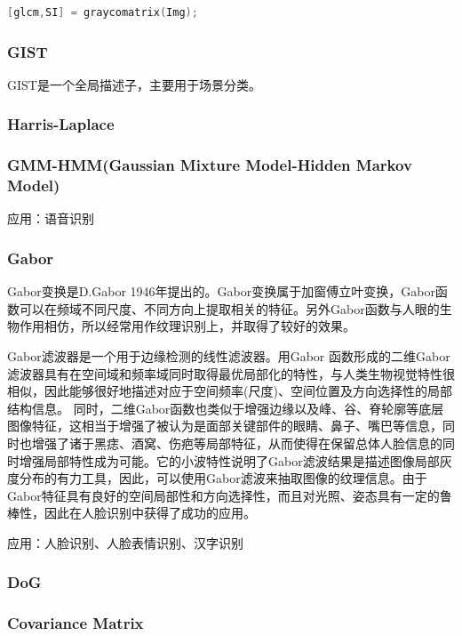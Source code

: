 \documentclass[12pt]{article}
\begin{document}
    \begin{lstlisting}[language=C++]
    [glcm,SI] = graycomatrix(Img);
    \end{lstlisting}

\subsubsection{GIST}

GIST是一个全局描述子，主要用于场景分类。

\subsubsection{Harris-Laplace}

\subsubsection{GMM-HMM(Gaussian Mixture Model-Hidden Markov Model)}

{\color{blue}应用}：语音识别

\subsubsection{Gabor}

Gabor变换是D.Gabor 1946年提出的。Gabor变换属于加窗傅立叶变换，Gabor函数可以在频域不同尺度、不同方向上提取相关的特征。另外Gabor函数与人眼的生物作用相仿，所以经常用作纹理识别上，并取得了较好的效果。

Gabor滤波器是一个用于边缘检测的线性滤波器。用Gabor 函数形成的二维Gabor 滤波器具有在空间域和频率域同时取得最优局部化的特性，与人类生物视觉特性很相似，因此能够很好地描述对应于空间频率(尺度)、空间位置及方向选择性的局部结构信息。
同时，二维Gabor函数也类似于增强边缘以及峰、谷、脊轮廓等底层图像特征，这相当于增强了被认为是面部关键部件的眼睛、鼻子、嘴巴等信息，同时也增强了诸于黑痣、酒窝、伤疤等局部特征，从而使得在保留总体人脸信息的同时增强局部特性成为可能。它的小波特性说明了Gabor滤波结果是描述图像局部灰度分布的有力工具，因此，可以使用Gabor滤波来抽取图像的纹理信息。由于Gabor特征具有良好的空间局部性和方向选择性，而且对光照、姿态具有一定的鲁棒性，因此在人脸识别中获得了成功的应用。

{\color{blue}应用}：人脸识别、人脸表情识别、汉字识别

\subsubsection{DoG}


\subsubsection{Covariance Matrix}
\end{document}
